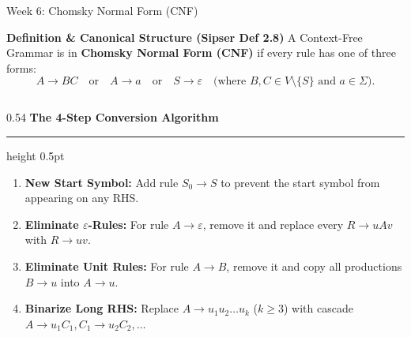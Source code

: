 \documentclass[aspectratio=169, 10pt]{beamer}
\newcommand{\colheader}[1]{%
  {\noindent\footnotesize\bfseries\color{gimpanavy}#1}%
  \vspace{0.03cm}%
  {\color{gimpanavy!30}\hrule height 0.5pt}%
  \vspace{0.08cm}%
}
\begin{document}
\begin{frame}{Week 6: Chomsky Normal Form (CNF)}
  \begin{tcolorbox}[conceptcard]
    {\bfseries\footnotesize\color{gimpanavy} Definition \& Canonical Structure (Sipser Def 2.8)}
    \vspace{0.04cm}
    \footnotesize
    A Context-Free Grammar is in \textbf{Chomsky Normal Form (CNF)} if every rule has one of three forms:
    $$A \to BC \quad\text{or}\quad A \to a \quad\text{or}\quad S \to \varepsilon \quad \text{(where $B, C \in V \setminus \{S\}$ and $a \in \Sigma$)}.$$
  \end{tcolorbox}

  \vspace{0.06cm}
  \begin{columns}[T]
    \begin{column}{0.54\textwidth}
      \colheader{The 4-Step Conversion Algorithm}
      \begin{tcolorbox}[examplecard, top=2.5pt, bottom=2.5pt]
        \begin{enumerate}\setlength{\itemsep}{2pt}\scriptsize
          \item \textbf{New Start Symbol:} Add rule $S_0 \to S$ to prevent the start symbol from appearing on any RHS.
          \item \textbf{Eliminate $\varepsilon$-Rules:} For rule $A \to \varepsilon$, remove it and replace every $R \to uAv$ with $R \to uv$.
          \item \textbf{Eliminate Unit Rules:} For rule $A \to B$, remove it and copy all productions $B \to u$ into $A \to u$.
          \item \textbf{Binarize Long RHS:} Replace $A \to u_1 u_2 \dots u_k$ ($k \ge 3$) with cascade $A \to u_1 C_1, C_1 \to u_2 C_2, \dots$
        \end{enumerate}
      \end{tcolorbox}
    \end{column}

    \hfill


\end{columns}
\end{frame}
\end{document}
